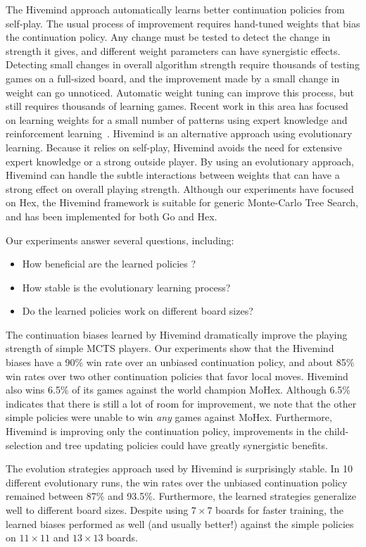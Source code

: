 \documentclass{acm_proc_article-sp}
\begin{document}
The Hivemind approach automatically learns better continuation policies from self-play. 
The usual process of improvement requires hand-tuned weights that bias the continuation policy. 
Any change must be tested to detect the change in strength it gives,
and different weight parameters can have synergistic effects.
Detecting small changes in overall algorithm strength require thousands of testing games on a full-sized board, and
the improvement made by a small change in weight can go unnoticed.
Automatic weight tuning can improve this process, but still requires thousands of learning games. 
Recent work in this area has focused on learning weights for a small number of patterns using expert knowledge and reinforcement learning~\cite{silver2009monte}. 
Hivemind is an alternative approach using evolutionary learning.
Because it relies on self-play, Hivemind avoids the need for extensive expert knowledge or a strong outside player.
By using an evolutionary approach, Hivemind can handle the subtle interactions between weights that can have a strong effect on overall playing strength.
Although our experiments have focused on Hex, 
the Hivemind framework is suitable for generic Monte-Carlo Tree Search, and has been implemented for
both Go and Hex.

Our experiments answer several questions, including: 
\begin{itemize}
\item How beneficial are the learned policies ? 
\item How stable is the evolutionary learning process? 
\item Do the learned policies work on different board sizes?
\end{itemize}


The continuation biases learned by Hivemind dramatically improve the playing strength of simple MCTS players.
Our experiments show that the Hivemind biases have a 90\% win rate over an unbiased continuation policy,
and about 85\% win rates over two other continuation policies that favor local moves.  
Hivemind also wins 6.5\% of its games against the world champion MoHex.
Although 6.5\% indicates that there is still a lot of room for improvement, 
we note that the other simple policies were unable to win \emph{any} games against MoHex. 
Furthermore, Hivemind is improving only the continuation policy, 
improvements in the child-selection and tree updating policies could have greatly synergistic benefits.

The evolution strategies approach used by Hivemind is surprisingly stable.
In 10 different evolutionary runs, the win rates over the unbiased continuation policy remained
between 87\% and 93.5\%.  
Furthermore, the learned strategies generalize well to different board sizes.
Despite using $7 \times 7$ boards for faster training, 
the learned biases performed as well (and usually better!) against the simple policies on $11 \times 11$ and $13 \times 13$ boards.
\end{document}
